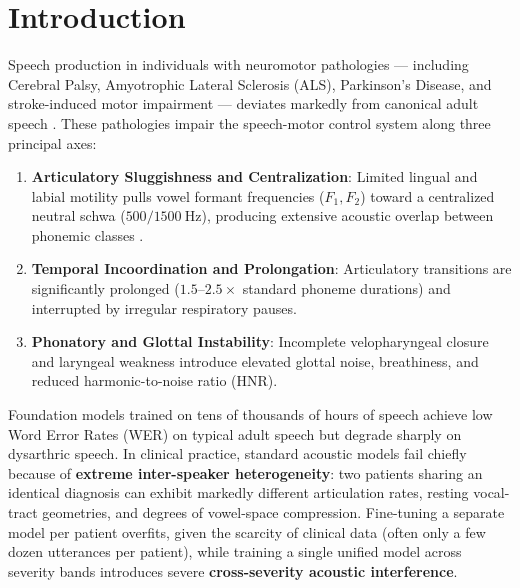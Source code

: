 \documentclass[10pt,twocolumn]{article}
\begin{document}
\begin{abstract}
\vspace{0.5em}
\noindent\textbf{Keywords:} Mixture of Experts, Dysarthria, Foundation Models, Speech Adapters, Routing Interpretability, Speaker Calibration, Connectionist Temporal Classification.
\vspace{1em}
\end{abstract}

\section{Introduction}

Speech production in individuals with neuromotor pathologies --- including Cerebral Palsy, Amyotrophic Lateral Sclerosis (ALS), Parkinson's Disease, and stroke-induced motor impairment --- deviates markedly from canonical adult speech \cite{rudzicz2012torgo, kim2008dysarthric, green2021relate}. These pathologies impair the speech-motor control system along three principal axes:

\begin{enumerate}
    \item \textbf{Articulatory Sluggishness and Centralization}: Limited lingual and labial motility pulls vowel formant frequencies ($F_1, F_2$) toward a centralized neutral schwa ($500/1500~\text{Hz}$), producing extensive acoustic overlap between phonemic classes \cite{weismer2001acoustic}.
    \item \textbf{Temporal Incoordination and Prolongation}: Articulatory transitions are significantly prolonged ($1.5$--$2.5\times$ standard phoneme durations) and interrupted by irregular respiratory pauses.
    \item \textbf{Phonatory and Glottal Instability}: Incomplete velopharyngeal closure and laryngeal weakness introduce elevated glottal noise, breathiness, and reduced harmonic-to-noise ratio (HNR).
\end{enumerate}

Foundation models trained on tens of thousands of hours of speech achieve low Word Error Rates (WER) on typical adult speech but degrade sharply on dysarthric speech. In clinical practice, standard acoustic models fail chiefly because of \textbf{extreme inter-speaker heterogeneity}: two patients sharing an identical diagnosis can exhibit markedly different articulation rates, resting vocal-tract geometries, and degrees of vowel-space compression. Fine-tuning a separate model per patient overfits, given the scarcity of clinical data (often only a few dozen utterances per patient), while training a single unified model across severity bands introduces severe \textbf{cross-severity acoustic interference}.
\end{document}
